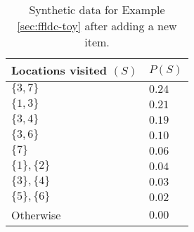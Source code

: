 \begin{table}
  \centering
  \caption{Synthetic data for Example \ref{sec:ffldc-toy} after adding a new item.}
  \begin{tabular}{@{}ll@{}}
    \toprule
    Locations visited $(S)$ & $P(S)$  \\
    \midrule
    $\{3,7\}$ & $0.24$ \\
    $\{1,3\}$ & $0.21$ \\
    $\{3,4\}$ & $0.19$ \\
    $\{3,6\}$ & $0.10$ \\
    $\{7\}$ & $0.06$ \\
    $\{1\}, \{2\}$ & $0.04$ \\ 
    $\{3\}, \{4\}$ & $0.03$ \\
    $\{5\}, \{6\}$ & $0.02$ \\
    Otherwise & $0.00$ \\
    \bottomrule
  \end{tabular}
  \label{tab:ffldc-toy-probs-2}
\end{table}